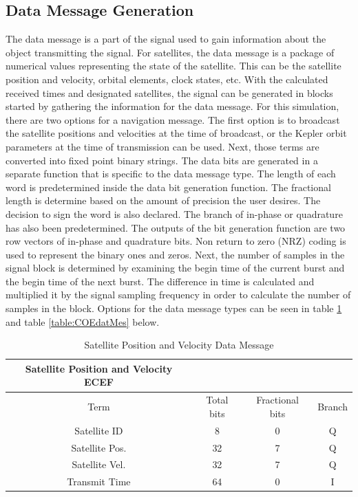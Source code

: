 \documentclass[12pt]{report}
\begin{document}
\subsection{Data Message Generation}
The data message is a part of the signal used to gain information about the object transmitting the signal. For satellites, the data message is a package of numerical values representing the state of the satellite. This can be the satellite position and velocity, orbital elements, clock states, etc. With the calculated received times and designated satellites, the signal can be generated in blocks started by gathering the information for the data message. For this simulation, there are two options for a navigation message. The first option is to broadcast the satellite positions and velocities at the time of broadcast, or the Kepler orbit parameters at the time of transmission can be used. Next, those terms are converted into fixed point binary strings. The data bits are generated in a separate function that is specific to the data message type. The length of each word is predetermined inside the data bit generation function.  The fractional length is determine based on the amount of precision the user desires. The decision to sign the word is also declared. The branch of in-phase or quadrature has also been predetermined. The outputs of the bit generation function are two row vectors of in-phase and quadrature bits. Non return to zero (NRZ) coding is used to represent the binary ones and zeros. Next, the number of samples in the signal block is determined by examining the begin time of the current burst and the begin time of the next burst. The difference in time is calculated and multiplied it by the signal sampling frequency in order to calculate the number of samples in the block. Options for the data message types can be seen in table \ref{table:SVPosDataMes} and table \ref{table:COEdatMes} below.

\begin{table}
\begin{center}
\begin{tabular}{|c|c|c|c|}
    \hline
    Satellite Position and Velocity ECEF \\
    \hline\hline
    Term & Total bits & Fractional bits & Branch \\
    \hline
    Satellite ID & 8 & 0 & Q \\
    \hline
    Satellite Pos. & 32 & 7 & Q \\
    \hline
    Satellite Vel. & 32 & 7 & Q \\
    \hline
    Transmit Time & 64 & 0 & I \\
    \hline
\end{tabular}
\caption{Satellite Position and Velocity Data Message}
\label{table:SVPosDataMes}
\end{center}
\end{table}
\end{document}
